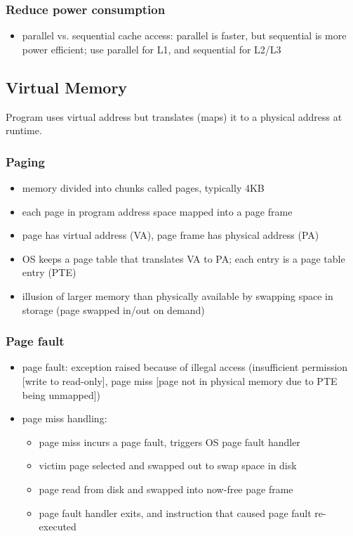 \documentclass[12pt]{extarticle}
\begin{document}
	\subsubsection{Reduce power consumption}

	\begin{itemize}
		\item parallel vs. sequential cache access: parallel is faster, but sequential is more power efficient; use parallel 
		for L1, and sequential for L2/L3
	\end{itemize}

	\subsection{Virtual Memory}

	Program uses virtual address but translates (maps) it to a physical address at runtime.

	\subsubsection{Paging}

	\begin{itemize}
		\item memory divided into chunks called pages, typically 4KB
		\item each page in program address space mapped into a page frame
		\item page has virtual address (VA), page frame has physical address (PA)
		\item OS keeps a page table that translates VA to PA; each entry is a page table entry (PTE)
		\item illusion of larger memory than physically available by swapping space in storage (page swapped in/out on demand)
	\end{itemize}

	\subsubsection{Page fault}

	\begin{itemize}
		\item page fault: exception raised because of illegal access (insufficient permission [write to read-only], page miss 
		[page not in physical memory due to PTE being unmapped])
		
		\item page miss handling:
		\begin{itemize}
			\item page miss incurs a page fault, triggers OS page fault handler
			\item victim page selected and swapped out to swap space in disk
			\item page read from disk and swapped into now-free page frame
			\item page fault handler exits, and instruction that caused page fault re-executed
		\end{itemize}
	\end{itemize}
\end{document}
